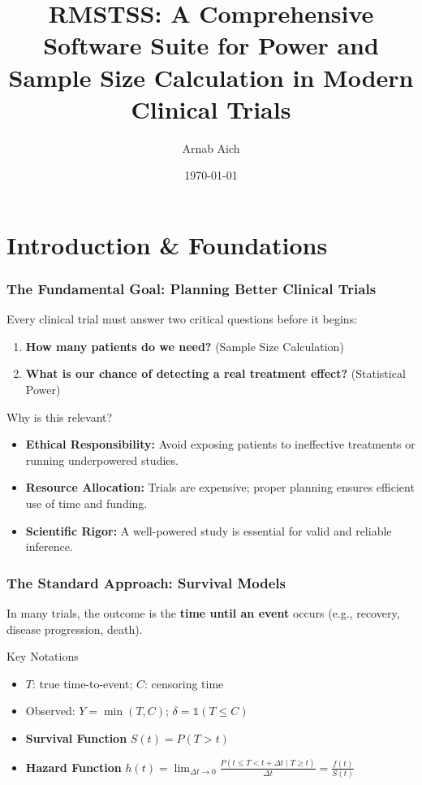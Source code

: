 \documentclass{beamer}
\date{}
\title[RMSTSS]{RMSTSS: A Comprehensive Software Suite for Power and Sample Size Calculation in Modern Clinical Trials}
\author{Arnab Aich}
\institute{Florida State University}
\date{\today}
\begin{document}
\begin{frame}
  \titlepage
\end{frame}

\section{Introduction \& Foundations}
\begin{frame}
\frametitle{The Fundamental Goal: Planning Better Clinical Trials}
Every clinical trial must answer two critical questions before it begins:

\begin{enumerate}
    \item \textbf{How many patients do we need?} (Sample Size Calculation)
    \item \textbf{What is our chance of detecting a real treatment effect?} (Statistical Power)
\end{enumerate}

\vspace{1em}

\begin{block}{Why is this relevant?}
\begin{itemize}
    \item \textbf{Ethical Responsibility:} Avoid exposing patients to ineffective treatments or running underpowered studies.
    \item \textbf{Resource Allocation:} Trials are expensive; proper planning ensures efficient use of time and funding.
    \item \textbf{Scientific Rigor:} A well-powered study is essential for valid and reliable inference.
\end{itemize}
\end{block}
\end{frame}

\begin{frame}
\frametitle{The Standard Approach: Survival Models}
In many trials, the outcome is the \textbf{time until an event} occurs (e.g., recovery, disease progression, death).

\begin{block}{Key Notations}
\begin{itemize}
    \item $T$: true time-to-event; \quad $C$: censoring time
    \item Observed: $Y = \min(T, C)$; \quad $\delta = \mathbb{1}(T \le C)$
    \item \textbf{Survival Function} $S(t) = P(T > t)$
    \item \textbf{Hazard Function} $h(t) = \displaystyle \lim_{\Delta t \to 0} \frac{P(t \le T < t + \Delta t \mid T \ge t)}{\Delta t} = \frac{f(t)}{S(t)}$
\end{itemize}
\end{block}
\end{frame}
\end{document}
